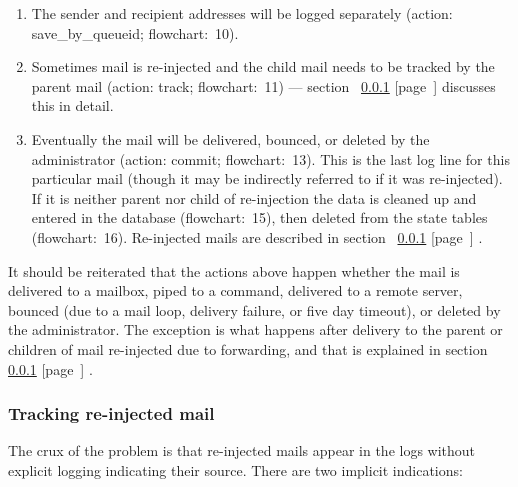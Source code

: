 \documentclass[a4paper,12pt,draft]{article}
\newcommand{\refwithpage}[1]{%
    \empty{}\ref{#1} [page~\pageref{#1}]%
}
\begin{document}
\begin{enumerate}

    \item The sender and recipient addresses will be logged separately
        (action: save\_by\_queueid; flowchart:~10).

    \item Sometimes mail is re-injected and the child mail needs to be
        tracked by the parent mail (action: track; flowchart:~11) ---
        section~\refwithpage{tracking re-injected mail} discusses this in
        detail.

    \item Eventually the mail will be delivered, bounced, or deleted by the
        administrator (action: commit; flowchart:~13).  This is the last
        log line for this particular mail (though it may be indirectly
        referred to if it was re-injected).  If it is neither parent nor
        child of re-injection the data is cleaned up and entered in the
        database (flowchart:~15), then deleted from the state tables
        (flowchart:~16).  Re-injected mails are described in
        section~\refwithpage{tracking re-injected mail}.

\end{enumerate}

It should be reiterated that the actions above happen whether the mail is
delivered to a mailbox, piped to a command, delivered to a remote server,
bounced (due to a mail loop, delivery failure, or five day timeout), or
deleted by the administrator.  The exception is what happens after delivery
to the parent or children of mail re-injected due to forwarding, and that
is explained in section~\refwithpage{tracking re-injected mail}.

\subsubsection{Tracking re-injected mail}

\label{tracking re-injected mail}

The crux of the problem is that re-injected mails appear in the logs
without explicit logging indicating their source.  There are two implicit
indications:
\end{document}

